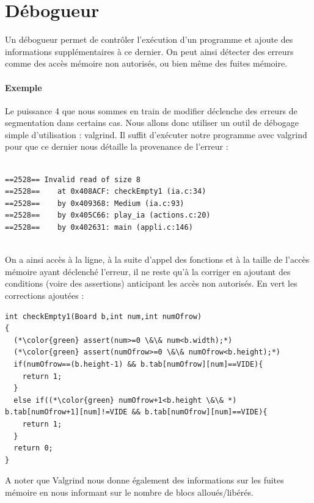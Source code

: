 \documentclass{report}
\begin{document}
\section{Débogueur}
Un débogueur permet de contrôler l'exécution d'un programme et ajoute des informations supplémentaires à ce dernier. On peut ainsi détecter des erreurs comme des accès mémoire non autorisés, ou bien même des fuites mémoire.
\paragraph{Exemple}
Le puissance 4 que nous sommes en train de modifier déclenche des erreurs de segmentation dans certains cas. Nous allons donc utiliser un outil de débogage simple d'utilisation : valgrind. Il suffit d'exécuter notre programme avec valgrind pour que ce dernier nous détaille la provenance de l'erreur :

\begin{scriptsize}
  \begin{lstlisting}

==2528== Invalid read of size 8
==2528==    at 0x408ACF: checkEmpty1 (ia.c:34)
==2528==    by 0x409368: Medium (ia.c:93)
==2528==    by 0x405C66: play_ia (actions.c:20)
==2528==    by 0x402631: main (appli.c:146)
    
  \end{lstlisting}
\end{scriptsize}

On a ainsi accès à la ligne, à la suite d'appel des fonctions et à la taille de l'accès mémoire ayant déclenché l'erreur, il ne reste qu'à la corriger en ajoutant des conditions (voire des assertions) anticipant les accès non autorisés. En vert les corrections ajoutées :

\begin{scriptsize}
  \begin{lstlisting}
int checkEmpty1(Board b,int num,int numOfrow)
{
  (*\color{green} assert(num>=0 \&\& num<b.width);*)
  (*\color{green} assert(numOfrow>=0 \&\& numOfrow<b.height);*)
  if(numOfrow==(b.height-1) && b.tab[numOfrow][num]==VIDE){
    return 1;
  }
  else if((*\color{green} numOfrow+1<b.height \&\& *) b.tab[numOfrow+1][num]!=VIDE && b.tab[numOfrow][num]==VIDE){
    return 1;
  }
  return 0;
}
  \end{lstlisting}
\end{scriptsize}

A noter que Valgrind nous donne également des informations sur les fuites mémoire en nous informant sur le nombre de blocs alloués/libérés.
\end{document}
